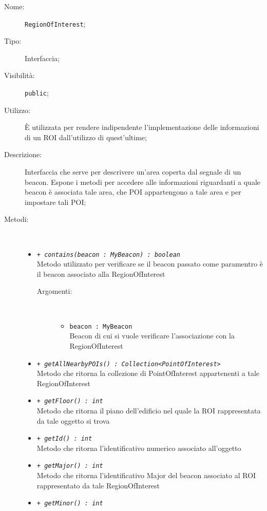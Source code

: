 \documentclass[../DefinizioneDiProdotto.tex]{subfiles}
\begin{document}
\begin{description}
	\item[Nome:] \texttt{RegionOfInterest};
	\item[Tipo:] Interfaccia;
	\item[Visibilità:] \texttt{public};
	\item[Utilizzo:] È utilizzata per rendere indipendente l'implementazione delle informazioni di un ROI dall'utilizzo di quest'ultime;
	\item[Descrizione:] Interfaccia che serve per descrivere un'area coperta dal segnale di un beacon. Espone i metodi per accedere alle informazioni riguardanti a quale beacon è associata tale area, che POI appartengono a tale area e per impostare tali POI;
	\item[Metodi:] \
	\begin{itemize}
		\item \texttt{+ \textit{contains(beacon : MyBeacon) : boolean}}\\
		Metodo utilizzato per verificare se il beacon passato come paramentro è il beacon associato alla RegionOfInterest
		\begin{description}
			\item[Argomenti:] \
			\begin{itemize}
				\item \texttt{beacon : MyBeacon}\\
				Beacon di cui si vuole verificare l'associazione con la RegionOfInterest\end{itemize}
		\end{description}
		\item \texttt{+ \textit{getAllNearbyPOIs() : Collection<PointOfInterest>}}\\
		Metodo che ritorna la collezione di PointOfInterest appartenenti a tale RegionOfInterest
		\item \texttt{+ \textit{getFloor() : int}}\\
		Metodo che ritorna il piano dell'edificio nel quale la ROI rappresentata da tale oggetto si trova
		\item \texttt{+ \textit{getId() : int}}\\
		Metodo che ritorna l'identificativo numerico associato all'oggetto
		\item \texttt{+ \textit{getMajor() : int}}\\
		Metodo che ritorna l'identificativo Major del beacon associato al ROI rappresentato da tale RegionOfInterest
		\item \texttt{+ \textit{getMinor() : int}}\\

\end{itemize}
\end{description}
\end{document}
